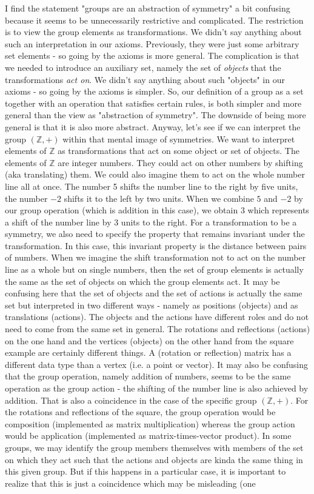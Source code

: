 \medskip
I find the statement "groups are an abstraction of symmetry" a bit confusing because it seems to be unnecessarily restrictive and complicated. The restriction is to view the group elements as transformations. We didn't say anything about such an interpretation in our axioms. Previously, they were just some arbitrary set elements - so going by the axioms is more general. The complication is that we needed to introduce an auxiliary set, namely the set of \emph{objects} that the transformations \emph{act on}. We didn't say anything about such "objects" in our axioms - so going by the axioms is simpler. So, our definition of a group as a set together with an operation that satisfies certain rules, is both simpler and more general than the view as "abstraction of symmetry". The downside of being more general is that it is also more abstract. Anyway, let's see if we can interpret the group $(\mathbb{Z},+)$ within that mental image of symmetries. We want to interpret elements of $\mathbb{Z}$ as transformations that act on some object or set of objects. The elements of $\mathbb{Z}$ are integer numbers. They could act on other numbers by shifting (aka translating) them. We could also imagine them to act on the whole number line all at once. The number 5 shifts the number line to the right by five units, the number $-2$ shifts it to the left by two units. When we combine $5$ and $-2$ by our group operation (which is addition in this case), we obtain $3$ which represents a shift of the number line by $3$ units to the right. For a transformation to be a symmetry, we also need to specify the property that remains invariant under the transformation. In this case, this invariant property is the distance between pairs of numbers. When we imagine the shift transformation not to act on the number line as a whole but on single numbers, then the set of group elements is actually the same as the set of objects on which the group elements act. It may be confusing here that the set of objects and the set of actions is actually the same set but interpreted in two different ways - namely as positions (objects) and as translations (actions). The objects and the actions have different roles and do not need to come from the same set in general. The rotations and reflections (actions) on the one hand and the  vertices (objects) on the other hand from the square example are certainly different things. A (rotation or reflection) matrix has a different data type than a vertex (i.e. a point or vector). It may also be confusing that the group operation, namely addition of numbers, seems to be the same operation as the group action - the shifting of the number line is also achieved by addition. That is also a coincidence in the case of the specific group $(\mathbb{Z},+)$. For the rotations and reflections of the square, the group operation would be composition (implemented as matrix multiplication) whereas the group action would be application (implemented as matrix-times-vector product). In some groups, we may identify the group members themselves with members of the set on which they act such that the actions and objects are kinda the same thing in this given group. But if this happens in a particular case, it is important to realize that this is just a coincidence which may be misleading (one 